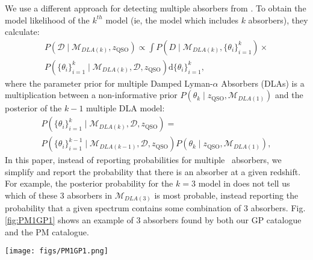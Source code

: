 \documentclass[fleqn,usenatbib]{mnras}
\newcommand{\civ}{\ion{C}{IV}}
\newcommand{\zciv}{z_{\civ}}
\newcommand{\zqso}{z_{\textrm{QSO}}}
\newcommand{\dd}{\textrm{d}}
\newcommand{\Data}{\mathcal{D}}
\newcommand{\model}{\mathcal{M}}
\begin{document}
We use a different approach for detecting multiple absorbers from
\cite{mfDLA}. To obtain the model likelihood of the $k^{th}$ model (ie, the model which includes $k$ absorbers), they calculate:
\begin{equation}
  \begin{split}
  P(\Data\mid \model_{DLA(k)}, \zqso) \propto
    \int P(D \mid \model_{DLA(k)}, \{\theta_i\}_{i=1}^{k})\times \\
    P(\{\theta_i\}^k_{i=1} \mid \model_{DLA(k)}, \Data, \zqso)\dd\{\theta_i\}_{i=1}^{k},
  \end{split}
\end{equation}
where the parameter prior for multiple Damped Lyman-$\alpha$ Absorbers (DLAs) is a multiplication between a non-informative prior
$P(\theta_k\mid \zqso,\model_{DLA(1)})$ and the posterior of the $k-1$ multiple DLA model:
\begin{equation}
  \begin{split}
    P(\{\theta_i\}^k_{i=1} \mid \model_{DLA(k)}, \Data, \zqso) = \\
    P(\{\theta_i\}^{k-1}_{i=1} \mid \model_{DLA(k-1)}, \Data, \zqso)P(\theta_k\mid \zqso,\model_{DLA(1)}),
  \end{split}
\end{equation}
In this paper, instead of reporting probabilities for multiple \civ\ absorbers, we
simplify and report the probability that there is an absorber at a given redshift.
For example, the posterior probability for the $k=3$ model in \cite{mfDLA} does not tell us which of these
$3$ absorbers in $\model_{DLA(3)}$ is most probable, instead reporting the probability that a given spectrum contains some combination of $3$ absorbers.
Fig. \ref{fig:PM1GP1}
shows an example of 3 absorbers found by both our GP catalogue and the PM catalogue.

\begin{figure*}
  \texttt{[image: figs/PM1GP1.png]}
  \caption{Example SDSS DR7 spectrum with QSO-ID 51608-0267-264 and $\zqso = 1.89$.
 Both PM and our pipeline find three absorbers. We also find a likely absorber at $\zciv=1.489$ (probability 92\%) that was not detected by PM, likely due to noise in this part of the spectrum.
The probability that our pipeline provides for the existence of \civ absorbers are
 P(CIV)=[1.00, 1.00, 1.00, 0.92], our maximum a posteriori absorber redshift values are
 $z_{CIV}$=[1.829, 1.672,1 .775, 1.489], and our rest equivalent widths from Voigt
 profile integration are REW(GP)=[ 1.37, 0.87, 0.90, 0.79]\AA. In the PM-catalogue the absorber redshifts are
$z_{PM}$=[ 1.831, 1.673, 1.777] and their corresponding rest equivalent widths are
REW(PM)=[1.21$\pm$0.18, 1.40$\pm$0.20, 0.94$\pm$0.19]}

  \label{fig:PM1GP1}
\end{figure*}
\end{document}
